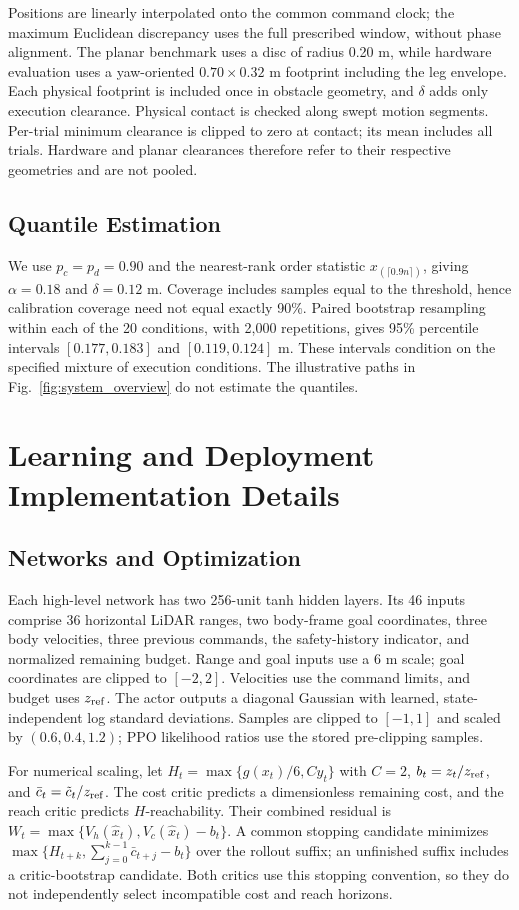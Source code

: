 \documentclass[conference]{IEEEtran}
\begin{document}
Positions are linearly interpolated onto the common command clock; the maximum
Euclidean discrepancy uses the full prescribed window, without phase alignment.
The planar benchmark uses a disc of radius 0.20 m, while hardware evaluation
uses a yaw-oriented $0.70\times0.32$ m footprint including the leg envelope.
Each physical footprint is included once in obstacle geometry, and $\delta$
adds only execution clearance. Physical contact is checked along swept motion
segments. Per-trial minimum clearance is clipped to zero at contact; its mean
includes all trials. Hardware and planar clearances therefore refer to their
respective geometries and are not pooled.

\subsection{Quantile Estimation}
We use $p_c=p_d=0.90$ and the nearest-rank order statistic
$x_{(\lceil0.9n\rceil)}$, giving $\alpha=0.18$ and $\delta=0.12$ m.
Coverage includes samples equal to the threshold, hence calibration coverage
need not equal exactly 90\%. Paired bootstrap resampling within each of the
20 conditions, with 2,000 repetitions, gives 95\% percentile intervals
$[0.177,0.183]$ and $[0.119,0.124]$ m. These intervals condition on the specified
mixture of execution conditions. The illustrative paths in
Fig.~\ref{fig:system_overview} do not estimate the quantiles.

\section{Learning and Deployment Implementation Details}
\label{app:learning_details}
\subsection{Networks and Optimization}
Each high-level network has two 256-unit tanh hidden layers. Its 46 inputs
comprise 36 horizontal LiDAR ranges, two body-frame goal coordinates, three
body velocities, three previous commands, the safety-history indicator, and
normalized remaining budget. Range and goal inputs use a 6 m scale; goal
coordinates are clipped to $[-2,2]$. Velocities use the command limits, and
budget uses $z_{\rm ref}$. The actor outputs a diagonal Gaussian with learned,
state-independent log standard deviations. Samples are clipped to $[-1,1]$
and scaled by $(0.6,0.4,1.2)$; PPO likelihood ratios use the stored
pre-clipping samples.

For numerical scaling, let $H_t=\max\{g(x_t)/6,Cy_t\}$ with $C=2$,
$b_t=z_t/z_{\rm ref}$, and $\bar c_t=\tilde c_t/z_{\rm ref}$.
The cost critic predicts a dimensionless remaining cost, and the reach critic
predicts $H$-reachability. Their combined residual is
$W_t=\max\{V_h(\hat x_t),V_c(\hat x_t)-b_t\}$.
A common stopping candidate minimizes
$\max\{H_{t+k},\sum_{j=0}^{k-1}\bar c_{t+j}-b_t\}$ over the rollout suffix;
an unfinished suffix includes a critic-bootstrap candidate. Both critics use
this stopping convention, so they do not independently select incompatible
cost and reach horizons.
\end{document}
